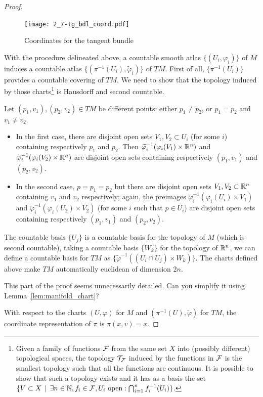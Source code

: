 \begin{proof}
  \begin{figure}[htp]
    \texttt{[image: 2\_7-tg\_bdl\_coord.pdf]}
    \caption{Coordinates for the tangent bundle}
  \end{figure}

  With the procedure delineated above, a countable smooth atlas $\{(U_i, \varphi_i)\}$ of $M$ induces a countable atlas $\{(\pi^{-1}(U_i), \widetilde\varphi_i)\}$ of $TM$.
  First of all, $\{\pi^{-1}(U_i)\}$ provides a countable covering of $TM$.
  We need to show that the topology induced by those charts\footnote{Given a family of functions $\mathcal{F}$ from the same set $X$ into (possibly different) topological spaces, the topology $\mathcal{T}_{\mathcal{F}}$ induced by the functions in $\mathcal{F}$ is the smallest topology such that all the functions are continuous. It is possible to show that such a topology exists and it has as a basis the set $\{V\subset X \,\mid\, \exists n\in\mathbb{N}, f_i\in\mathcal{F}, U_i \mbox{ open} : \bigcap_{i=1}^n f_i^{-1}(U_i) \}$.} is Hausdorff and second countable.

  Let $(p_1, v_1), (p_2, v_2) \in TM$ be different points: either $p_1\neq p_2$, or $p_1 = p_2$ and $v_1 \neq v_2$.
  \begin{itemize}
    \item In the first case, there are disjoint open sets $V_1, V_2 \subset U_i$ (for some $i$) containing respectively $p_1$ and $p_2$.
          Then $\widetilde\varphi_i^{-1}(\varphi_i(V_1)\times\mathbb{R}^n)$ and $\widetilde\varphi_i^{-1}(\varphi_i(V_2)\times\mathbb{R}^n)$ are disjoint open sets containing respectively $(p_1, v_1)$ and $(p_2, v_2)$.
    \item In the second case, $p=p_1=p_2$ but there are disjoint open sets $V_1,V_2\subset \mathbb{R}^n$ containing $v_1$ and $v_2$ respectively;
          again, the preimages $\widetilde\varphi_i^{-1}(\varphi_i(U_i)\times V_1)$ and $\widetilde\varphi_i^{-1}(\varphi_i(U_2)\times V_2)$ (for some $i$ such that $p\in U_i$) are disjoint open sets containing respectively $(p_1, v_1)$ and $(p_2, v_2)$.
  \end{itemize}

  The countable basis $\{U_j\}$ is a countable basis for the topology of $M$ (which is second countable), taking a countable basis $\{W_k\}$ for the topology of $\mathbb{R}^n$, we can define a countable basis for $TM$ as $\{\widetilde\varphi^{-1}((U_i\cap U_j)\times W_k)\}$.
  The charts defined above make $TM$ automatically euclidean of dimension $2n$.

  \begin{exercise}
    This part of the proof seems unnecessarily detailed.
    Can you simplify it using Lemma~\ref{lem:manifold_chart}?
  \end{exercise}

   With respect to the charts $(U,\varphi)$ for $M$ and $(\pi^{-1}(U), \widetilde\varphi)$ for $TM$, the coordinate representation of $\pi$ is $\pi(x,v) = x$.
\end{proof}

